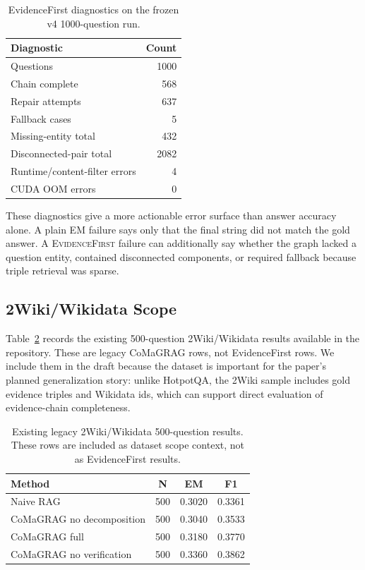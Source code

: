\documentclass[runningheads]{llncs}
\newcommand{\sys}{\textsc{EvidenceFirst}\xspace}
\begin{document}
\begin{table}[t]
\centering
\caption{EvidenceFirst diagnostics on the frozen v4 1000-question run.}
\label{tab:diag}
\begin{tabular}{lr}
\toprule
Diagnostic & Count \\
\midrule
Questions & 1000 \\
Chain complete & 568 \\
Repair attempts & 637 \\
Fallback cases & 5 \\
Missing-entity total & 432 \\
Disconnected-pair total & 2082 \\
Runtime/content-filter errors & 4 \\
CUDA OOM errors & 0 \\
\bottomrule
\end{tabular}
\end{table}

These diagnostics give a more actionable error surface than answer accuracy
alone. A plain EM failure says only that the final string did not match the
gold answer. A \sys failure can additionally say whether the graph lacked a
question entity, contained disconnected components, or required fallback
because triple retrieval was sparse.

\subsection{2Wiki/Wikidata Scope}

Table~\ref{tab:2wiki_scope} records the existing 500-question
2Wiki/Wikidata results available in the repository. These are legacy CoMaGRAG
rows, not EvidenceFirst rows. We include them in the draft because the dataset
is important for the paper's planned generalization story: unlike HotpotQA, the
2Wiki sample includes gold evidence triples and Wikidata ids, which can support
direct evaluation of evidence-chain completeness.

\begin{table}[t]
\centering
\caption{Existing legacy 2Wiki/Wikidata 500-question results. These rows are
included as dataset scope context, not as EvidenceFirst results.}
\label{tab:2wiki_scope}
\begin{tabular}{lccc}
\toprule
Method & N & EM & F1 \\
\midrule
Naive RAG & 500 & 0.3020 & 0.3361 \\
CoMaGRAG no decomposition & 500 & 0.3040 & 0.3533 \\
CoMaGRAG full & 500 & 0.3180 & 0.3770 \\
CoMaGRAG no verification & 500 & 0.3360 & 0.3862 \\
\bottomrule
\end{tabular}
\end{table}
\end{document}

